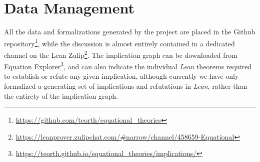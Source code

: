 \section{Data Management}

All the data and formalizations generated by the project are placed in the Github repository\footnote{\url{https://github.com/teorth/equational_theories}}, while the discussion is almost entirely contained in a dedicated channel on the Lean Zulip\footnote{\url{https://leanprover.zulipchat.com/\#narrow/channel/458659-Equational}}.  The implication graph can be downloaded from Equation Explorer\footnote{\url{https://teorth.github.io/equational_theories/implications/}}, and can also indicate the individual \emph{Lean} theorems required to establish or refute any given implication, although currently we have only formalized a generating set of implications and refutations in \emph{Lean}, rather than the entirety of the implication graph.
